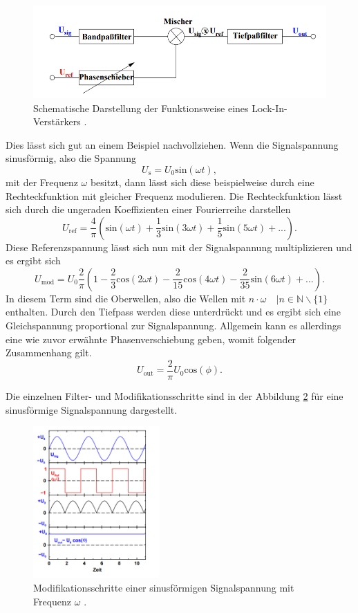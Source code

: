 \begin{figure}
    \centering
    \includegraphics[width=\textwidth]{bilder/theo1.png}
    \caption{Schematische Darstellung der Funktionsweise eines Lock-In-Verstärkers \cite{skript}.} 
    \label{fig:theo1}
\end{figure}
Dies lässt sich gut an einem Beispiel nachvollziehen. Wenn die Signalspannung sinusförmig, also die Spannung
\begin{equation*}
    U_{\text{s}} = U_0 \text{sin}(\omega t),
\end{equation*}
mit der Frequenz $\omega$ besitzt, dann lässt sich diese beispielweise durch eine Rechteckfunktion mit gleicher Frequenz modulieren. Die Rechteckfunktion lässt sich durch
die ungeraden Koeffizienten einer Fourierreihe darstellen
\begin{equation*}
    U_{\text{ref}} = \frac{4}{\pi}\left( \text{sin}(\omega t) + \frac{1}{3}  \text{sin}(3\omega t) + \frac{1}{5}  \text{sin}(5\omega t) + ...\right).
\end{equation*}
Diese Referenzspannung lässt sich nun mit der Signalspannung multiplizieren und es ergibt sich
\begin{equation*}
    U_{\text{mod}} = U_0 \frac{2}{\pi}\left(1- \frac{2}{3} \text{cos}(2\omega t) - \frac{2}{15}  \text{cos}(4\omega t) - \frac{2}{35}  \text{sin}(6\omega t) + ...\right).
\end{equation*}
In diesem Term sind die Oberwellen, also die Wellen mit $n \cdot \omega \quad | n \in \mathbb{N}\backslash\{1\}$ enthalten. Durch den Tiefpass werden diese unterdrückt und es ergibt 
sich eine Gleichspannung proportional zur Signalspannung. Allgemein kann es allerdings eine wie zuvor erwähnte Phasenverschiebung geben, womit folgender Zusammenhang gilt.
\begin{equation}
    U_{\text{out}} =\frac{2}{\pi}U_{0} \text{cos}(\phi).
\end{equation}

Die einzelnen Filter- und Modifikationsschritte sind in der Abbildung \ref{fig:theo2} für eine sinusförmige Signalspannung dargestellt.

\begin{figure}
    \centering
    \includegraphics[width=0.43\textwidth]{bilder/theo2.png}
    \caption{Modifikationsschritte einer sinusförmigen Signalspannung mit Frequenz $\omega$ \cite{skript}.} 
    \label{fig:theo2}
\end{figure}